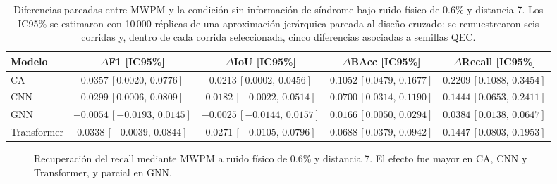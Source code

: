 \documentclass[fleqn,10pt]{wlscirep}
\begin{document}
\begin{table}[H]
\centering
\caption{Diferencias pareadas entre MWPM y la condición sin información de síndrome bajo ruido físico de 0.6\% y distancia 7. Los IC95\% se estimaron con 10\,000 réplicas de una aproximación jerárquica pareada al diseño cruzado: se remuestrearon seis corridas y, dentro de cada corrida seleccionada, cinco diferencias asociadas a semillas QEC.}
\label{tab:bootstrap_downstream}
\scriptsize
\setlength{\tabcolsep}{4pt}
\begin{tabular}{lcccc}
\toprule
\textbf{Modelo} & \textbf{$\Delta$F1 [IC95\%]} & \textbf{$\Delta$IoU [IC95\%]} & \textbf{$\Delta$BAcc [IC95\%]} & \textbf{$\Delta$Recall [IC95\%]} \\
\midrule
CA & $0.0357\,[0.0020,\,0.0776]$ & $0.0213\,[0.0002,\,0.0456]$ & $0.1052\,[0.0479,\,0.1677]$ & $0.2209\,[0.1088,\,0.3454]$ \\
CNN & $0.0299\,[0.0006,\,0.0809]$ & $0.0182\,[-0.0022,\,0.0514]$ & $0.0700\,[0.0314,\,0.1190]$ & $0.1444\,[0.0653,\,0.2411]$ \\
GNN & $-0.0054\,[-0.0193,\,0.0145]$ & $-0.0025\,[-0.0144,\,0.0157]$ & $0.0166\,[0.0050,\,0.0294]$ & $0.0384\,[0.0138,\,0.0647]$ \\
Transformer & $0.0338\,[-0.0039,\,0.0844]$ & $0.0271\,[-0.0105,\,0.0796]$ & $0.0688\,[0.0379,\,0.0942]$ & $0.1447\,[0.0803,\,0.1953]$ \\
\bottomrule
\end{tabular}
\end{table}

\begin{figure}[H]
\centering
{}
\caption{Recuperación del recall mediante MWPM a ruido físico de 0.6\% y distancia 7. El efecto fue mayor en CA, CNN y Transformer, y parcial en GNN.}
\label{fig:recall_qec}
\end{figure}
\end{document}
